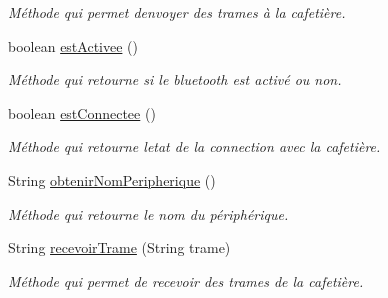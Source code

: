 \begin{DoxyCompactItemize}
\begin{DoxyCompactList}\small\item\em Méthode qui permet d\textquotesingle{}envoyer des trames à la cafetière. \end{DoxyCompactList}\item 
boolean \hyperlink{classcom_1_1example_1_1ekawa_1_1_communication_a1007662e44cb2d0af3bef6d36246bf9a}{est\+Activee} ()
\begin{DoxyCompactList}\small\item\em Méthode qui retourne si le bluetooth est activé ou non. \end{DoxyCompactList}\item 
boolean \hyperlink{classcom_1_1example_1_1ekawa_1_1_communication_a0c591a578528edaa5bb665cede5738bc}{est\+Connectee} ()
\begin{DoxyCompactList}\small\item\em Méthode qui retourne l\textquotesingle{}etat de la connection avec la cafetière. \end{DoxyCompactList}\item 
String \hyperlink{classcom_1_1example_1_1ekawa_1_1_communication_a133dd63afcf2d2f1229a416abe099494}{obtenir\+Nom\+Peripherique} ()
\begin{DoxyCompactList}\small\item\em Méthode qui retourne le nom du périphérique. \end{DoxyCompactList}\item 
String \hyperlink{classcom_1_1example_1_1ekawa_1_1_communication_a0ca98776b3fe48fa76e134607edb7871}{recevoir\+Trame} (String trame)
\begin{DoxyCompactList}\small\item\em Méthode qui permet de recevoir des trames de la cafetière. \end{DoxyCompactList}\end{DoxyCompactItemize}
